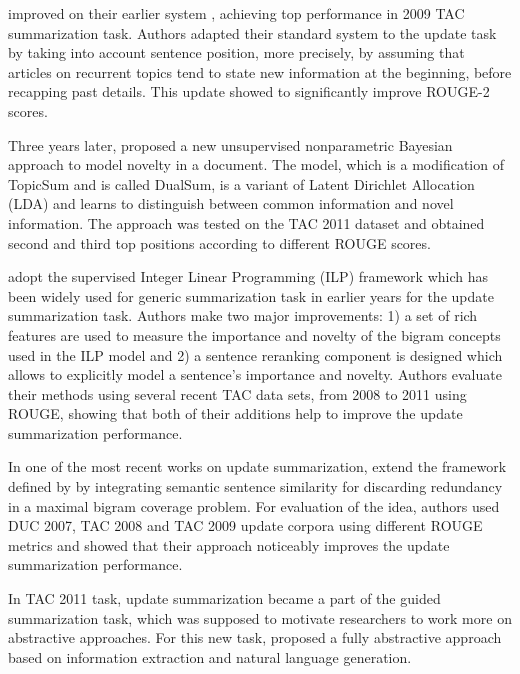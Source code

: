 \documentclass[11pt,a4paper,onecolumn]{article}
\begin{document}
 improved on their earlier system \cite{gillick2008icsi}, achieving top performance in 2009 TAC summarization task.
Authors adapted their standard system to the update task by taking into account sentence position, more precisely, by assuming that articles on recurrent topics tend to state new information at the beginning, before recapping past details.
This update showed to significantly improve ROUGE-2 scores.

Three years later,  proposed a new unsupervised nonparametric Bayesian approach to model novelty in a document.
The model, which is a modification of TopicSum and is called DualSum, is a variant of Latent Dirichlet Allocation (LDA) and learns to distinguish between common information and novel information.
The approach was tested on the TAC 2011 dataset and obtained second and third top positions according to different ROUGE scores.

 adopt the supervised Integer Linear Programming (ILP) framework which has been widely used for generic summarization task in earlier years \cite{martins2009summarization, woodsend2012multiple} for the update summarization task.
Authors make two major improvements: 1) a set of rich features are used to measure the importance and novelty of the bigram concepts used in the ILP model and 2) a sentence reranking component is designed which allows  to explicitly model a sentence’s importance and novelty.
Authors evaluate their methods using several recent TAC data sets, from 2008 to 2011 using ROUGE, showing that both of their additions help to improve the update summarization performance.

In one of the most recent works on update summarization,  extend the framework defined by  by integrating semantic sentence similarity for discarding redundancy in a maximal bigram coverage problem.
For evaluation of the idea, authors used DUC 2007, TAC 2008 and TAC 2009 update corpora using different ROUGE metrics and showed that their approach noticeably improves the update summarization performance.

In TAC 2011 task, update summarization became a part of the guided summarization task, which was supposed to motivate researchers to work more on abstractive approaches.
For this new task,  proposed a fully abstractive approach based on information extraction and natural language generation.
\end{document}
